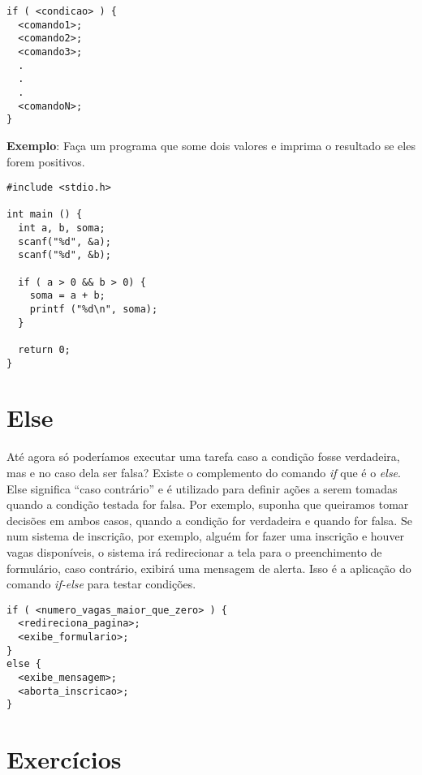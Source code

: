 \begin{lstlisting}[label=comandoIf,caption=Exemplo múltiplos comandos]
if ( <condicao> ) {
  <comando1>;
  <comando2>;
  <comando3>;
  .
  .
  .
  <comandoN>;
}
\end{lstlisting}

\textbf{Exemplo}:
  Faça um programa que some dois valores e imprima o resultado se eles forem positivos.

\begin{lstlisting}[label=comandoIf,caption=Exemplo múltiplos comandos]
#include <stdio.h>

int main () {
  int a, b, soma;
  scanf("%d", &a);  
  scanf("%d", &b);
  
  if ( a > 0 && b > 0) {
    soma = a + b;
    printf ("%d\n", soma);
  }
  
  return 0;
}
\end{lstlisting}

\section{Else}
Até agora só poderíamos executar uma tarefa caso a condição fosse verdadeira, mas e no caso dela ser falsa? Existe o complemento do comando \textit{if} que é o \textit{else}. Else significa ``caso contrário'' e é utilizado para definir ações a serem tomadas quando a condição testada for falsa.
Por exemplo, suponha que queiramos tomar decisões em ambos casos, quando a condição for verdadeira e quando for falsa. Se num sistema de inscrição, por exemplo, alguém for fazer uma inscrição e houver vagas disponíveis, o sistema irá redirecionar a tela para o preenchimento de formulário, caso contrário, exibirá uma mensagem de alerta. Isso é a aplicação do comando \textit{if-else} para testar condições.

\begin{lstlisting}[label=comandoIf,caption=Exemplo com else]
if ( <numero_vagas_maior_que_zero> ) {
  <redireciona_pagina>;
  <exibe_formulario>;
}
else {
  <exibe_mensagem>;
  <aborta_inscricao>;
}
\end{lstlisting}

\newpage
\section{Exercícios}

